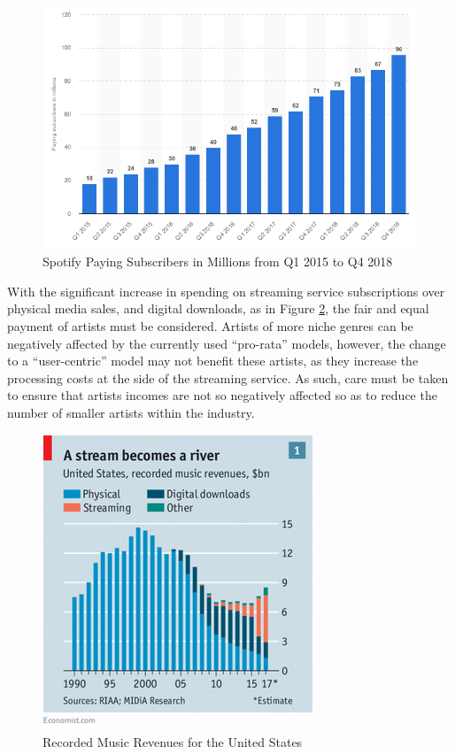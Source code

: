\documentclass[11pt,a4paper,headinclude=false,footinclude=false]{scrreprt}
\begin{document}
\begin{figure}[H]
\includegraphics{Ethics/PayingSubscribers.png}
\centering
\caption{Spotify Paying Subscribers in Millions from Q1 2015 to Q4 2018}
\label{PayingSubs}
\end{figure}

With the significant increase in spending on streaming service
subscriptions over physical media sales, and digital downloads, as in
Figure \ref{StreamBecomesRiver}, the fair and equal payment of artists
must be considered. Artists of more niche genres can be negatively
affected by the currently used ``pro-rata'' models, however, the change
to a ``user-centric'' model may not benefit these artists, as they
increase the processing costs at the side of the streaming service. As
such, care must be taken to ensure that artists incomes are not so
negatively affected so as to reduce the number of smaller artists within
the industry.

\begin{figure}[H]
\includegraphics{Ethics/StreamBecomesRiver.png}
\centering
\caption{Recorded Music Revenues for the United States \cite{SpotPay18}}
\label{StreamBecomesRiver}
\end{figure}
\end{document}
